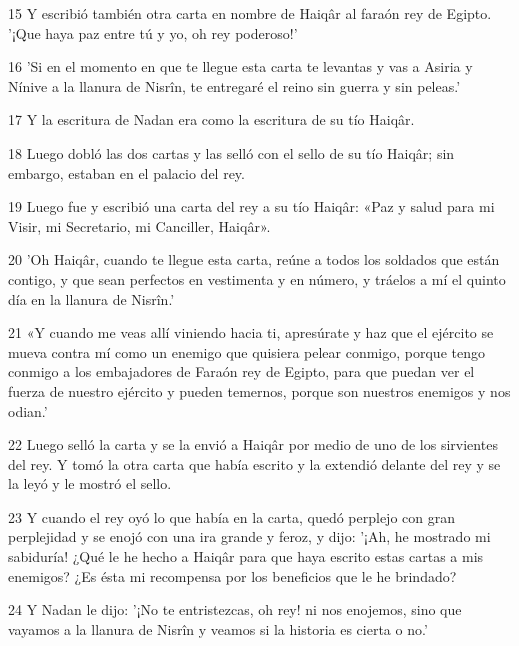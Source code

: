 \par 15 Y escribió también otra carta en nombre de Haiqâr al faraón rey de Egipto. '¡Que haya paz entre tú y yo, oh rey poderoso!'

\par 16 'Si en el momento en que te llegue esta carta te levantas y vas a Asiria y Nínive a la llanura de Nisrîn, te entregaré el reino sin guerra y sin peleas.'

\par 17 Y la escritura de Nadan era como la escritura de su tío Haiqâr.

\par 18 Luego dobló las dos cartas y las selló con el sello de su tío Haiqâr; sin embargo, estaban en el palacio del rey.

\par 19 Luego fue y escribió una carta del rey a su tío Haiqâr: «Paz y salud para mi Visir, mi Secretario, mi Canciller, Haiqâr».

\par 20 'Oh Haiqâr, cuando te llegue esta carta, reúne a todos los soldados que están contigo, y que sean perfectos en vestimenta y en número, y tráelos a mí el quinto día en la llanura de Nisrîn.'

\par 21 «Y cuando me veas allí viniendo hacia ti, apresúrate y haz que el ejército se mueva contra mí como un enemigo que quisiera pelear conmigo, porque tengo conmigo a los embajadores de Faraón rey de Egipto, para que puedan ver el fuerza de nuestro ejército y pueden temernos, porque son nuestros enemigos y nos odian.'

\par 22 Luego selló la carta y se la envió a Haiqâr por medio de uno de los sirvientes del rey. Y tomó la otra carta que había escrito y la extendió delante del rey y se la leyó y le mostró el sello.

\par 23 Y cuando el rey oyó lo que había en la carta, quedó perplejo con gran perplejidad y se enojó con una ira grande y feroz, y dijo: '¡Ah, he mostrado mi sabiduría! ¿Qué le he hecho a Haiqâr para que haya escrito estas cartas a mis enemigos? ¿Es ésta mi recompensa por los beneficios que le he brindado?

\par 24 Y Nadan le dijo: '¡No te entristezcas, oh rey! ni nos enojemos, sino que vayamos a la llanura de Nisrîn y veamos si la historia es cierta o no.'

